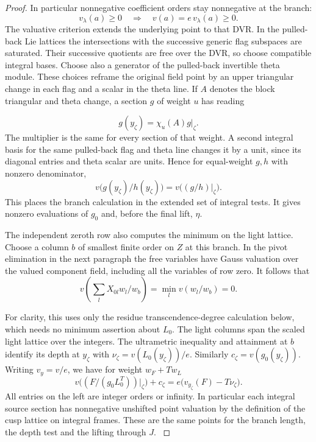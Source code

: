 \begin{proof}
In particular nonnegative coefficient orders stay nonnegative at the branch:
\[
  v_\lambda(a)\ge0\quad\Longrightarrow\quad v(a)=e\,v_\lambda(a)\ge0.
\]
The valuative criterion extends the underlying point to that DVR.
In the pulled-back Lie lattices the intersections with the
successive generic flag subspaces are saturated. Their successive
quotients are free over the DVR, so choose compatible integral
bases. Choose also a generator of the pulled-back invertible
theta module. These choices reframe the original field point
by an upper triangular change in each flag and a scalar in the
theta line. If \(A\) denotes the block triangular and theta change,
a section \(g\) of weight \(u\) has reading

\[
  g(y_\zeta)=\chi_u(A)g|_\zeta.
\]
 The multiplier is the
same for every section of that weight. A second integral
basis for the same pulled-back flag and theta line changes
it by a unit, since its diagonal entries and theta scalar
are units. Hence for equal-weight \(g,h\) with nonzero
denominator,
\[
   v\big(g(y_\zeta)/h(y_\zeta)\big)
         =v\big((g/h)|_\zeta\big).
\]
This places the branch calculation in the extended set
of integral tests. It gives nonzero
evaluations of \(g_0\) and, before the final lift, \(\eta\).

The independent zeroth row also computes the minimum on the
light lattice. Choose a column \(b\) of smallest finite order
on \(Z\) at this branch. In the pivot elimination in the next
paragraph the free variables have Gauss valuation over the valued
component field, including all the variables of row zero.
It follows that
\[
 v\left(\sum_l X_{0l}w_l/w_b\right)=
 \min_l v(w_l/w_b)=0 .
\]

For clarity, this uses only the residue transcendence-degree
calculation below, which needs no minimum assertion about \(L_0\).
The light columns span the scaled light lattice over the integers.
The ultrametric inequality and attainment at \(b\) identify its
depth at \(y_\zeta\) with \(\nu_\zeta=v(L_0(y_\zeta))/e\).
Similarly \(c_\zeta=v(g_0(y_\zeta))\). Writing
\(v_y=v/e\), we have for weight \(w_F+Tw_L\)
\[
 v\big((F/(g_0 L_0^T))|_\zeta\big)+c_\zeta
                   = e\big(v_{y_\zeta}(F)-T\nu_\zeta\big).
\]
All entries on the left are integer orders or infinity. In particular
each integral source section has nonnegative unshifted point valuation
by the definition of the cusp lattice on integral frames. These are
the same points for the branch length, the depth test and the lifting
through \(J\). \label{cor:selected-slice-3}
\end{proof}

